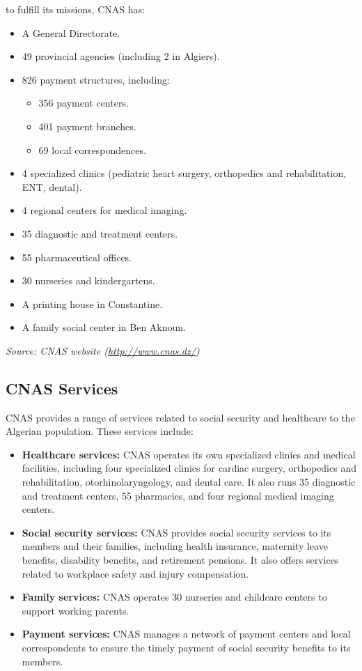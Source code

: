 to fulfill its missions, CNAS has: 
\begin{itemize}
\item A General Directorate.
\item 49 provincial agencies (including 2 in Algiers).
\item 826 payment structures, including:
\begin{itemize}
\item 356 payment centers.
\item 401 payment branches.
\item 69 local correspondences.
\end{itemize}
\item 4 specialized clinics (pediatric heart surgery, orthopedics and rehabilitation, ENT, dental).
\item 4 regional centers for medical imaging.
\item 35 diagnostic and treatment centers.
\item 55 pharmaceutical offices.
\item 30 nurseries and kindergartens.
\item A printing house in Constantine.
\item A family social center in Ben Aknoun.
\end{itemize}

\textit{Source: CNAS website (\url{http://www.cnas.dz/})}
\subsection{CNAS Services}
CNAS provides a range of services related to social security and healthcare to the Algerian population. These services include:
\begin{itemize}
    \item \textbf{Healthcare services:} CNAS operates its own specialized clinics and medical facilities, including four specialized clinics for cardiac surgery, orthopedics and rehabilitation, otorhinolaryngology, and dental care. It also runs 35 diagnostic and treatment centers, 55 pharmacies, and four regional medical imaging centers.

    \item \textbf{Social security services:} CNAS provides social security services to its members and their families, including health insurance, maternity leave benefits, disability benefits, and retirement pensions. It also offers services related to workplace safety and injury compensation.

    \item \textbf{Family services:} CNAS operates 30 nurseries and childcare centers to support working parents.

    \item \textbf{Payment services:} CNAS manages a network of payment centers and local correspondents to ensure the timely payment of social security benefits to its members.
\end{itemize}
